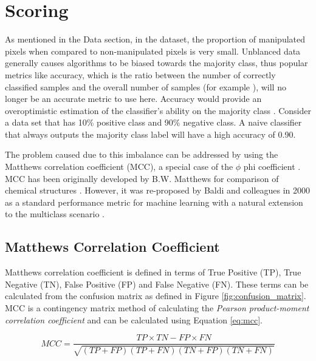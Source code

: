 
\section{Scoring}

As mentioned in the Data section, in the dataset, the proportion of manipulated pixels when compared to non-manipulated pixels is very small. Unblanced data generally causes algorithms 
to be biased towards the majority class, thus popular metrics like accuracy, which is the ratio between the number of correctly classified samples and the overall number of samples
(for example \cite{wang2007accurate}), will no longer be an accurate metric to use here. Accuracy would provide an overoptimistic estimation  of the classifier's ability on 
the majority class \cite{chicco2020advantages}. Consider a data set that has 10\% positive class and 90\% negative class. A naive classifier that always outputs the
majority class label will have a high accuracy of 0.90. 


The problem caused due to this imbalance can be addressed by using the Matthews correlation coefficient (MCC), a special case of the $\phi$ phi coefficient 
\cite{guilford1954psychometric}. MCC has been originally developed by B.W. Matthews for comparison of chemical structures \cite{matthews1975comparison}. However, it was 
re-proposed by Baldi and colleagues \cite{baldi2000assessing} in 2000 as a standard performance metric for machine learning with a natural extension to the multiclass
scenario \cite{gorodkin2004comparing}.

\subsection{Matthews Correlation Coefficient}

Matthews correlation coefficient is defined in terms of True Positive (TP), True Negative (TN), False Positive (FP) and False Negative (FN). These terms can be calculated 
from the confusion matrix as defined in Figure \ref{fig:confusion_matrix}. MCC is a contingency matrix method of calculating the \emph{Pearson product-moment correlation
coefficient} \cite{powers2020evaluation} and can be calculated using Equation \ref{eq:mcc}.

\begin{equation} \label{eq:mcc}
    MCC = \frac{TP \times TN - FP \times FN}{\sqrt{(TP+FP)(TP+FN)(TN+FP)(TN+FN)}}
\end{equation}

